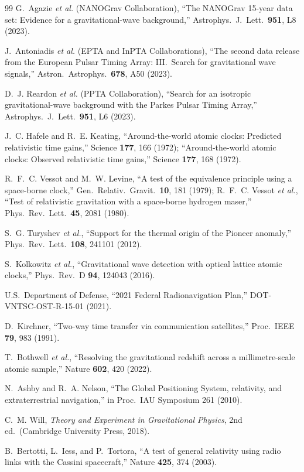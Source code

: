 \documentclass[aps,prd,twocolumn,superscriptaddress,nofootinbib]{revtex4-2}
\begin{document}
\begin{thebibliography}{99}
G.~Agazie \textit{et al.} (NANOGrav Collaboration),
``The NANOGrav 15-year data set: Evidence for a gravitational-wave
background,''
Astrophys.\ J.\ Lett.\ \textbf{951}, L8 (2023).

J.~Antoniadis \textit{et al.} (EPTA and InPTA Collaborations),
``The second data release from the European Pulsar Timing Array:
III.\ Search for gravitational wave signals,''
Astron.\ Astrophys.\ \textbf{678}, A50 (2023).

D.~J. Reardon \textit{et al.} (PPTA Collaboration),
``Search for an isotropic gravitational-wave background with the
Parkes Pulsar Timing Array,''
Astrophys.\ J.\ Lett.\ \textbf{951}, L6 (2023).

J.~C. Hafele and R.~E. Keating,
``Around-the-world atomic clocks: Predicted relativistic time gains,''
Science \textbf{177}, 166 (1972);
``Around-the-world atomic clocks: Observed relativistic time gains,''
Science \textbf{177}, 168 (1972).

R.~F.~C. Vessot and M.~W. Levine,
``A test of the equivalence principle using a space-borne clock,''
Gen.\ Relativ.\ Gravit.\ \textbf{10}, 181 (1979);
R.~F.~C. Vessot \textit{et al.},
``Test of relativistic gravitation with a space-borne hydrogen maser,''
Phys.\ Rev.\ Lett.\ \textbf{45}, 2081 (1980).

S.~G. Turyshev \textit{et al.},
``Support for the thermal origin of the Pioneer anomaly,''
Phys.\ Rev.\ Lett.\ \textbf{108}, 241101 (2012).

S.~Kolkowitz \textit{et al.},
``Gravitational wave detection with optical lattice atomic clocks,''
Phys.\ Rev.\ D \textbf{94}, 124043 (2016).

U.S.\ Department of Defense,
``2021 Federal Radionavigation Plan,''
DOT-VNTSC-OST-R-15-01 (2021).

D.~Kirchner,
``Two-way time transfer via communication satellites,''
Proc.\ IEEE \textbf{79}, 983 (1991).

T.~Bothwell \textit{et al.},
``Resolving the gravitational redshift across a millimetre-scale
atomic sample,''
Nature \textbf{602}, 420 (2022).

N.~Ashby and R.~A. Nelson,
``The Global Positioning System, relativity, and extraterrestrial
navigation,''
in Proc.\ IAU Symposium 261 (2010).

C.~M. Will,
\textit{Theory and Experiment in Gravitational Physics},
2nd ed.\ (Cambridge University Press, 2018).

B.~Bertotti, L.~Iess, and P.~Tortora,
``A test of general relativity using radio links with the Cassini
spacecraft,''
Nature \textbf{425}, 374 (2003).

\end{thebibliography}
\end{document}
